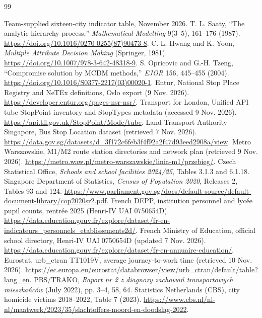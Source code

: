 \documentclass{mcmthesis}
\begin{document}
\begin{thebibliography}{99}
\raggedright\small
\setlength{\parskip}{0pt}\setlength{\itemsep}{-2pt}\setlength{\parsep}{0pt}
 Team-supplied sixteen-city indicator table, November 2026.
 T. L. Saaty, ``The analytic hierarchy process,'' \textit{Mathematical Modelling} 9(3--5), 161--176 (1987). \url{https://doi.org/10.1016/0270-0255(87)90473-8}.
 C.-L. Hwang and K. Yoon, \textit{Multiple Attribute Decision Making} (Springer, 1981). \url{https://doi.org/10.1007/978-3-642-48318-9}.
 S. Opricovic and G.-H. Tzeng, ``Compromise solution by MCDM methods,'' \textit{EJOR} 156, 445--455 (2004). \url{https://doi.org/10.1016/S0377-2217(03)00020-1}.
 Entur, National Stop Place Registry and NeTEx definitions, Oslo export (9 Nov. 2026). \url{https://developer.entur.org/pages-nsr-nsr/}.
 Transport for London, Unified API tube StopPoint inventory and StopTypes metadata (accessed 9 Nov. 2026). \url{https://api.tfl.gov.uk/StopPoint/Mode/tube}.
 Land Transport Authority Singapore, Bus Stop Location dataset (retrieved 7 Nov. 2026). \url{https://data.gov.sg/datasets/d_3f172c6feb3f4f92a2f47d93eed2908a/view}.
 Metro Warszawskie, M1/M2 route station directories and network plan (retrieved 9 Nov. 2026). \url{https://metro.waw.pl/metro-warszawskie/linia-m1/przebieg/}.
 Czech Statistical Office, \textit{Schools and school facilities 2024/25}, Tables 3.1.3 and 6.1.18.
 Singapore Department of Statistics, \textit{Census of Population 2020}, Releases 2, Tables 93 and 124. \url{https://www.parliament.gov.sg/docs/default-source/default-document-library/cop2020sr2.pdf}.
 French DEPP, institution personnel and lycée pupil counts, rentrée 2025 (Henri-IV UAI 0750654D). \url{https://data.education.gouv.fr/explore/dataset/fr-en-indicateurs_personnels_etablissements2d/}.
 French Ministry of Education, official school directory, Henri-IV UAI 0750654D (updated 7 Nov. 2026). \url{https://data.education.gouv.fr/explore/dataset/fr-en-annuaire-education/}.
 Eurostat, urb\_ctran TT1019V, average journey-to-work time (retrieved 10 Nov. 2026). \url{https://ec.europa.eu/eurostat/databrowser/view/urb_ctran/default/table?lang=en}.
 PBS/TRAKO, \textit{Raport nr 2 z diagnozy zachowa\'n transportowych mieszka\'nców} (July 2022), pp. 3--4, 58, 64.
 Statistics Netherlands (CBS), city homicide victims 2018--2022, Table 7 (2023). \url{https://www.cbs.nl/nl-nl/maatwerk/2023/35/slachtoffers-moord-en-doodslag-2022}.

\end{thebibliography}
\end{document}
